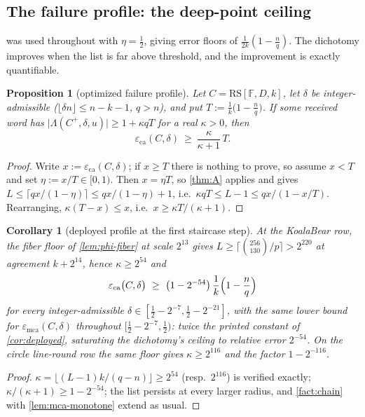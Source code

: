 \documentclass[11pt]{article}
\newtheorem{proposition}[proposition]{Proposition}
\newtheorem{corollary}[corollary]{Corollary}
\theoremstyle{definition}
\theoremstyle{remark}
\newcommand{\F}{\mathbb{F}}
\newcommand{\RS}{\mathrm{RS}}
\newcommand{\eca}{\varepsilon_{\mathrm{ca}}}
\newcommand{\emca}{\varepsilon_{\mathrm{mca}}}
\newcommand{\Lst}{\Lambda}
\begin{document}
\subsection{The failure profile: the deep-point ceiling}\label{sec:answers-profile}

 was used throughout with $\eta=\frac12$, giving error floors of $\frac1{2k}(1-\frac nq)$. The dichotomy improves when the list is far above threshold, and the improvement is exactly quantifiable.

\begin{proposition}[optimized failure profile]\label{prop:profile}
Let $C=\RS[\F,D,k]$, let $\delta$ be integer-admissible \textup($\lfloor\delta n\rfloor\le n-k-1$, $q>n$\textup), and put $T:=\frac1k\bigl(1-\frac nq\bigr)$. If some received word has $\bigl|\Lst(C^+,\delta,u)\bigr|\ge1+\kappa qT$ for a real $\kappa>0$, then
\[
\eca(C,\delta)\ \ge\ \frac{\kappa}{\kappa+1}\,T .
\]
\end{proposition}

\begin{proof}
Write $x:=\eca(C,\delta)$; if $x\ge T$ there is nothing to prove, so assume $x<T$ and set $\eta:=x/T\in[0,1)$. Then $x=\eta T$, so \cref{thm:A} applies and gives $L\le\lceil qx/(1-\eta)\rceil\le qx/(1-\eta)+1$, i.e.\ $\kappa qT\le L-1\le qx/(1-x/T)$. Rearranging, $\kappa(T-x)\le x$, i.e.\ $x\ge\kappa T/(\kappa+1)$.
\end{proof}

\begin{corollary}[deployed profile at the first staircase step]\label{cor:profile-deployed}
At the KoalaBear row, the fiber floor of \cref{lem:phi-fiber} at scale $2^{13}$ gives $L\ge\lceil\binom{256}{130}/p\rceil>2^{220}$ at agreement $k+2^{14}$, hence $\kappa\ge2^{54}$ and
\[
\eca\bigl(C,\delta\bigr)\ \ge\ \bigl(1-2^{-54}\bigr)\,\frac1k\Bigl(1-\frac nq\Bigr)
\]
for every integer-admissible $\delta\in[\frac12-2^{-7},\frac12-2^{-21}]$, with the same lower bound for $\emca(C,\delta)$ throughout $[\frac12-2^{-7},\frac12)$: twice the printed constant of \cref{cor:deployed}, saturating the dichotomy's ceiling to relative error $2^{-54}$. On the circle line-round row the same floor gives $\kappa\ge2^{116}$ and the factor $1-2^{-116}$.
\end{corollary}

\begin{proof}
$\kappa=\lfloor(L-1)k/(q-n)\rfloor\ge2^{54}$ \textup(resp.\ $2^{116}$\textup) is verified exactly; $\kappa/(\kappa+1)\ge1-2^{-54}$; the list persists at every larger radius, and \cref{fact:chain} with \cref{lem:mca-monotone} extend as usual.
\end{proof}
\end{document}
